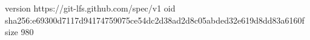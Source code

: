 version https://git-lfs.github.com/spec/v1
oid sha256:e69300d7117d94174759075ce54dc2d38ad2d8c05abded32e619d8dd83a6160f
size 980
